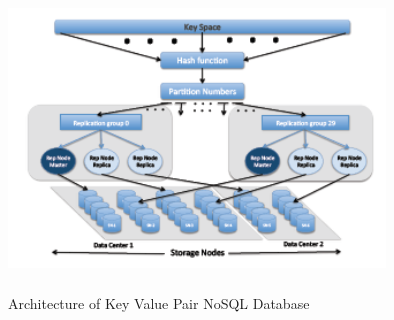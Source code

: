 \begin{figure}[h]
\centering
  \includegraphics[width=10cm,height=8cm]{A1.png}
  \caption{Architecture of Key Value Pair NoSQL Database}
  \label{Architecture of Key Value Pair NoSQL Database}
\end{figure}

